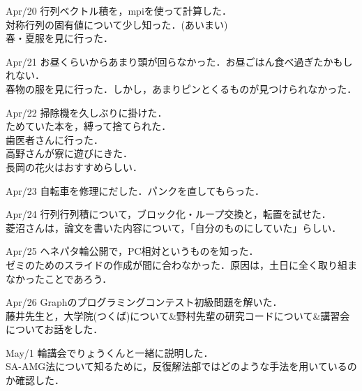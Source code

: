 \documentclass[11pt, a4paper]{jsarticle}
\begin{document}
\begin{itembox}[r]{Apr/20}
	行列ベクトル積を，mpiを使って計算した．\\
	対称行列の固有値について少し知った．(あいまい)\\
	春・夏服を見に行った．
\end{itembox}

\begin{itembox}[r]{Apr/21}
	お昼くらいからあまり頭が回らなかった．お昼ごはん食べ過ぎたかもしれない．\\
	春物の服を見に行った．しかし，あまりピンとくるものが見つけられなかった．
\end{itembox}

\begin{itembox}[r]{Apr/22}
	掃除機を久しぶりに掛けた．\\
	ためていた本を，縛って捨てられた．\\
	歯医者さんに行った．\\
	高野さんが寮に遊びにきた．\\
	長岡の花火はおすすめらしい．
\end{itembox}

\begin{itembox}[r]{Apr/23}
	自転車を修理にだした．パンクを直してもらった．\\
\end{itembox}

\begin{itembox}[r]{Apr/24}
	行列行列積について，ブロック化・ループ交換と，転置を試せた．\\
	菱沼さんは，論文を書いた内容について，「自分のものにしていた」らしい．\\
\end{itembox}

\begin{itembox}[r]{Apr/25}
	ヘネパタ輪公開で，PC相対というものを知った．\\
	ゼミのためのスライドの作成が間に合わなかった．原因は，土日に全く取り組まなかったことであろう．
\end{itembox}

\begin{itembox}[r]{Apr/26}
	Graphのプログラミングコンテスト初級問題を解いた．\\
	藤井先生と，大学院(つくば)について\&野村先輩の研究コードについて\&講習会についてお話をした．
\end{itembox}

\begin{itembox}[r]{May/1}
輪講会でりょうくんと一緒に説明した．\\
SA-AMG法について知るために，反復解法部ではどのような手法を用いているのか確認した．
\end{itembox}
\end{document}
